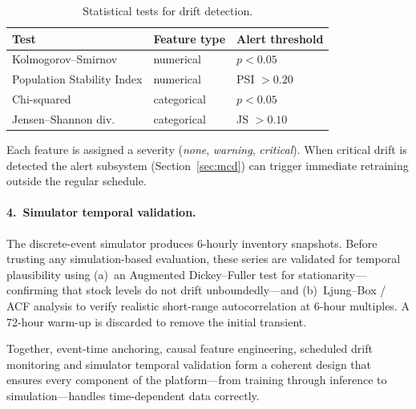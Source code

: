 \begin{table}[htbp]
\centering
\caption{Statistical tests for drift detection.}
\label{tab:drift-tests}
\small
\begin{tabular}{@{}lll@{}}
\toprule
\textbf{Test} & \textbf{Feature type} & \textbf{Alert threshold} \\
\midrule
Kolmogorov--Smirnov    & numerical    & $p < 0.05$ \\
Population Stability Index & numerical & PSI $> 0.20$ \\
Chi-squared            & categorical  & $p < 0.05$ \\
Jensen--Shannon div.   & categorical  & JS $> 0.10$ \\
\bottomrule
\end{tabular}
\end{table}

Each feature is assigned a severity (\emph{none}, \emph{warning},
\emph{critical}).  When critical drift is detected the alert subsystem
(Section~\ref{sec:mcd}) can trigger immediate retraining outside the
regular schedule.

\paragraph{4.\ Simulator temporal validation.}

The discrete-event simulator produces 6-hourly inventory snapshots.
Before trusting any simulation-based evaluation, these series are
validated for temporal plausibility using (a)~an Augmented Dickey--Fuller
test for stationarity—confirming that stock levels do not drift
unboundedly—and (b)~Ljung--Box / ACF analysis to verify realistic
short-range autocorrelation at 6-hour multiples.  A 72-hour warm-up is
discarded to remove the initial transient.

\bigskip

Together, event-time anchoring, causal feature engineering, scheduled
drift monitoring and simulator temporal validation form a coherent design
that ensures every component of the platform—from training through
inference to simulation—handles time-dependent data correctly.
